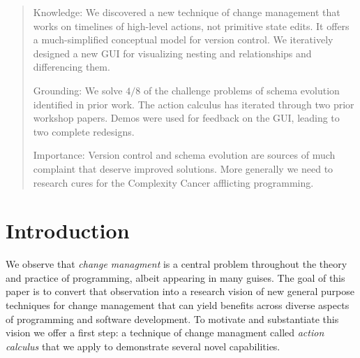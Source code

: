 \documentclass[english,submission]{programming}
\theoremstyle{definition}
\begin{document}
\begin{abstract}
Knowledge: We discovered a new technique of change management that works on timelines of high-level actions, not primitive state edits. It offers a much-simplified conceptual model for version control. We iteratively designed a new GUI for visualizing nesting and relationships and differencing them.

Grounding: We solve $4/8$ of the challenge problems of schema evolution identified in prior work.
The action calculus has iterated through two prior workshop papers. Demos were used for feedback on the GUI, leading to two complete redesigns.

Importance: Version control and schema evolution are sources of much complaint that deserve improved solutions. More generally we need to research cures for the Complexity Cancer afflicting programming.

\end{abstract}






\section{Introduction}

We observe that \textit{change managment} is a central problem throughout the theory and practice of programming, albeit appearing in many guises. The goal of this paper is to convert that observation into a research vision of new general purpose techniques for change management that can yield benefits across diverse aspects of programming and software development. To motivate and substantiate this vision we offer a first step: a technique of change managment called \textit{action calculus} that we apply to demonstrate several novel capabilities.
\end{document}
